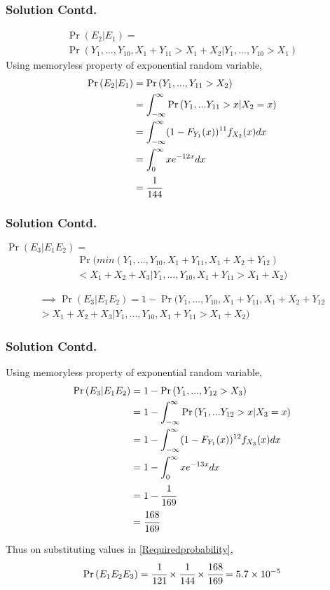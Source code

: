\documentclass{beamer}
\providecommand{\pr}[1]{\ensuremath{\Pr\left(#1\right)}}
\begin{document}
\begin{frame}
\frametitle{Solution Contd.}

\begin{multline}
    \pr{E_2|E_1} =\\
    \pr{Y_1,...,Y_{10},X_1+Y_{11} > X_1 + X_2|Y_1,...,Y_{10} > X_1}
\end{multline}
Using memoryless property of exponential random variable,
\begin{align}
    \pr{E_2|E_1} &= \pr{Y_1,...,Y_{11} > X_2}\\
                 &= \int_{-\infty}^{\infty} \pr{Y_1,...Y_{11} > x|X_2 = x}\\
                 &= \int_{-\infty}^{\infty} (1-F_{Y_1}(x))^{11} f_{X_2}(x)dx\\
                 &= \int_{0}^{\infty} x e^{-12x} dx\\
                 &= \cfrac{1}{144}
\end{align}

\end{frame}
\begin{frame}
\frametitle{Solution Contd.}

$\pr{E_3|E_1E_2} = $  
\begin{multline}
    \Pr(min(Y_1,...,Y_{10},X_1+Y_{11},X_1+X_2+Y_{12}) \\
    < X_1+X_2+X_3| Y_1,...,Y_{10},X_1+Y_{11} > X_1+X_2)
\end{multline}

\begin{multline}
\implies \pr{E_3|E_1E_2} = 1 - \Pr(Y_1,...,Y_{10},X_1+Y_{11},X_1+X_2+Y_{12} \\
    > X_1+X_2+X_3| Y_1,...,Y_{10},X_1+Y_{11} > X_1+X_2)
\end{multline}

\end{frame}
\begin{frame}
\frametitle{Solution Contd.}
Using memoryless property of exponential random variable,
\begin{align}
    \pr{E_3|E_1E_2} &= 1 - \pr{Y_1,...,Y_{12} > X_3}\\
                    &= 1 - \int_{-\infty}^{\infty} \pr{Y_1,...Y_{12} > x|X_3 = x}\\
                    &= 1 - \int_{-\infty}^{\infty} (1-F_{Y_1}(x))^{12} f_{X_3}(x)dx\\
                    &= 1 - \int_{0}^{\infty} x e^{-13x} dx\\
                    &= 1 - \cfrac{1}{169}\\
                    &= \cfrac{168}{169}
\end{align}

Thus on substituting values in \eqref{Requiredprobability}, 
\begin{align}
    \pr{E_1E_2E_3} = \cfrac{1}{121}\times \cfrac{1}{144}\times \cfrac{168}{169}= 5.7 \times 10^{-5}
\end{align}

\end{frame}
\end{document}

